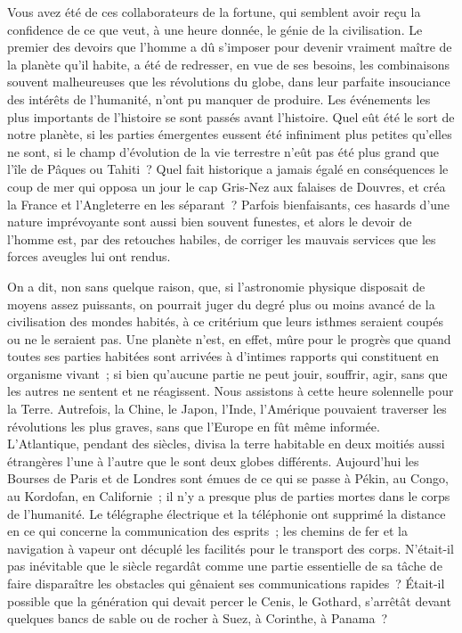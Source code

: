 \documentclass[french,twoside]{book} %
\newcommand\orgName[1]{#1}
\newcommand\placeName[1]{#1}
\begin{document}
Vous avez été de ces collaborateurs de la fortune, qui semblent avoir reçu la confidence de ce que veut, à une heure donnée, le génie de la civilisation. Le premier des devoirs que l’homme a dû s’imposer pour devenir vraiment maître de la planète qu’il habite, a été de redresser, en vue de ses besoins, les combinaisons souvent malheureuses que les révolutions du globe, dans leur parfaite insouciance des intérêts de l’humanité, n’ont pu manquer de produire. Les événements les plus importants de l’histoire se sont passés avant l’histoire. Quel eût été le sort de notre planète, si les parties émergentes eussent été infiniment plus petites qu’elles ne sont, si le champ d’évolution de la vie terrestre n’eût pas été plus grand que l’{\placeName île de Pâques} ou {\placeName Tahiti} ? Quel fait historique a jamais égalé en conséquences le coup de mer qui opposa un jour le {\placeName cap Gris-Nez} aux {\placeName falaises de Douvres}, et créa la {\placeName France} et l’{\placeName Angleterre} en les séparant ? Parfois bienfaisants, ces hasards d’une nature imprévoyante sont aussi bien souvent funestes, et alors le devoir de l’homme est, par des retouches habiles, de corriger les mauvais services que les forces aveugles lui ont rendus.\par
On a dit, non sans quelque raison, que, si l’astronomie physique disposait de moyens assez puissants, on pourrait juger du degré plus ou moins avancé de la civilisation des mondes habités, à ce critérium que leurs isthmes seraient coupés ou ne le seraient pas. Une planète n’est, en effet, mûre pour le progrès que quand toutes ses parties habitées sont arrivées à d’intimes rapports qui constituent en organisme vivant ; si bien qu’aucune partie ne peut jouir, souffrir, agir, sans que les autres ne sentent et ne réagissent. Nous assistons à cette heure solennelle pour la {\placeName Terre}. Autrefois, la {\orgName Chine}, le {\orgName Japon}, l’{\orgName Inde}, l’{\orgName Amérique} pouvaient traverser les révolutions les plus graves, sans que l’{\orgName Europe} en fût même informée. L’{\placeName Atlantique}, pendant des siècles, divisa la terre habitable en deux moitiés aussi étrangères l’une à l’autre que le sont deux globes différents. Aujourd’hui les {\orgName Bourses} de {\placeName Paris} et de {\placeName Londres} sont émues de ce qui se passe à {\placeName Pékin}, au {\placeName Congo}, au {\placeName Kordofan}, en {\placeName Californie} ; il n’y a presque plus de parties mortes dans le corps de l’humanité. Le télégraphe électrique et la téléphonie ont supprimé la distance en ce qui concerne la communication des esprits ; les chemins de fer et la navigation à vapeur ont décuplé les facilités pour le transport des corps. N’était-il pas inévitable que le siècle regardât comme une partie essentielle de sa tâche de faire disparaître les obstacles qui gênaient ses communications rapides ? Était-il possible que la génération qui devait percer le {\placeName Cenis}, le {\placeName Gothard}, s’arrêtât devant quelques bancs de sable ou de rocher à {\placeName Suez}, à {\placeName Corinthe}, à {\placeName Panama} ?\par
\end{document}
